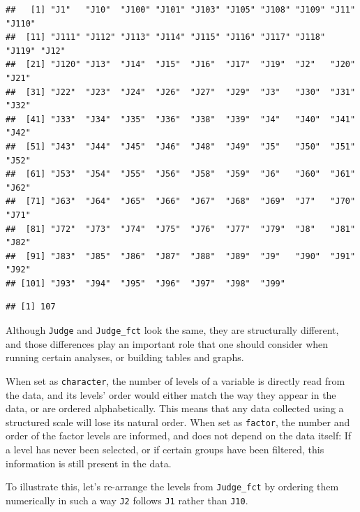 \documentclass[
]{book}
\newenvironment{Shaded}{\begin{snugshade}}{\end{snugshade}}
\newcommand{\AttributeTok}[1]{\textcolor[rgb]{0.77,0.63,0.00}{#1}}
\newcommand{\ConstantTok}[1]{\textcolor[rgb]{0.00,0.00,0.00}{#1}}
\newcommand{\FunctionTok}[1]{\textcolor[rgb]{0.00,0.00,0.00}{#1}}
\newcommand{\NormalTok}[1]{#1}
\newcommand{\OtherTok}[1]{\textcolor[rgb]{0.56,0.35,0.01}{#1}}
\newcommand{\SpecialCharTok}[1]{\textcolor[rgb]{0.00,0.00,0.00}{#1}}
\begin{document}
\begin{verbatim}
##   [1] "J1"   "J10"  "J100" "J101" "J103" "J105" "J108" "J109" "J11"  "J110"
##  [11] "J111" "J112" "J113" "J114" "J115" "J116" "J117" "J118" "J119" "J12" 
##  [21] "J120" "J13"  "J14"  "J15"  "J16"  "J17"  "J19"  "J2"   "J20"  "J21" 
##  [31] "J22"  "J23"  "J24"  "J26"  "J27"  "J29"  "J3"   "J30"  "J31"  "J32" 
##  [41] "J33"  "J34"  "J35"  "J36"  "J38"  "J39"  "J4"   "J40"  "J41"  "J42" 
##  [51] "J43"  "J44"  "J45"  "J46"  "J48"  "J49"  "J5"   "J50"  "J51"  "J52" 
##  [61] "J53"  "J54"  "J55"  "J56"  "J58"  "J59"  "J6"   "J60"  "J61"  "J62" 
##  [71] "J63"  "J64"  "J65"  "J66"  "J67"  "J68"  "J69"  "J7"   "J70"  "J71" 
##  [81] "J72"  "J73"  "J74"  "J75"  "J76"  "J77"  "J79"  "J8"   "J81"  "J82" 
##  [91] "J83"  "J85"  "J86"  "J87"  "J88"  "J89"  "J9"   "J90"  "J91"  "J92" 
## [101] "J93"  "J94"  "J95"  "J96"  "J97"  "J98"  "J99"
\end{verbatim}

\begin{Shaded}
\end{Shaded}

\begin{verbatim}
## [1] 107
\end{verbatim}

Although \texttt{Judge} and \texttt{Judge\_fct} look the same, they are structurally different, and those differences play an important role that one should consider when running certain analyses, or building tables and graphs.

When set as \texttt{character}, the number of levels of a variable is directly read from the data, and its levels' order would either match the way they appear in the data, or are ordered alphabetically. This means that any data collected using a structured scale will lose its natural order.
When set as \texttt{factor}, the number and order of the factor levels are informed, and does not depend on the data itself: If a level has never been selected, or if certain groups have been filtered, this information is still present in the data.

To illustrate this, let's re-arrange the levels from \texttt{Judge\_fct} by ordering them numerically in such a way \texttt{J2} follows \texttt{J1} rather than \texttt{J10}.

\begin{Shaded}
\end{Shaded}
\end{document}
